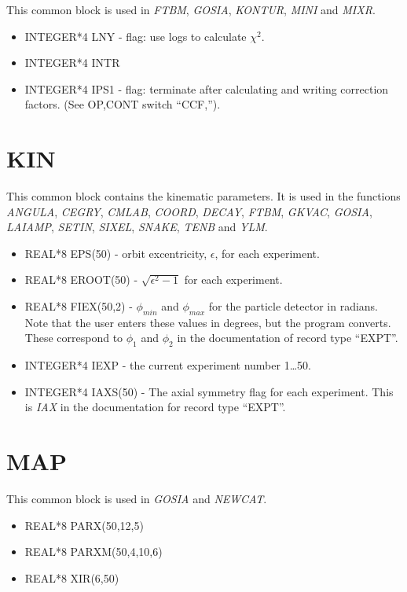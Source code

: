 This common block is used in {\em FTBM}, {\em GOSIA}, {\em KONTUR}, {\em
MINI} and {\em MIXR}.

\begin{itemize}
\item INTEGER*4 LNY - flag: use logs to calculate $\chi^2$.
\item INTEGER*4 INTR
\item INTEGER*4 IPS1 - flag: terminate after calculating and writing
correction factors. (See OP,CONT switch ``CCF,'').
\end{itemize}

\section{KIN}

This common block contains the kinematic parameters. It is used in the
functions {\em ANGULA}, {\em CEGRY}, {\em CMLAB}, {\em COORD}, {\em DECAY},
{\em FTBM}, {\em GKVAC}, {\em GOSIA}, {\em LAIAMP}, {\em SETIN}, {\em
SIXEL}, {\em SNAKE}, {\em TENB} and {\em YLM}.

\begin{itemize}
\item REAL*8 EPS(50) - orbit excentricity, $\epsilon$, for each experiment.
\item REAL*8 EROOT(50) - $\sqrt{\epsilon^2 -1}$ for each experiment.
\item REAL*8 FIEX(50,2) - $\phi_{min}$ and $\phi_{max}$ for the particle
detector in radians. Note that the user enters these values in degrees, but
the program converts. These correspond to $\phi_1$ and $\phi_2$ in the
documentation of record type ``EXPT''.
\item INTEGER*4 IEXP - the current experiment number 1{\ldots}50.
\item INTEGER*4 IAXS(50) - The axial symmetry flag for each experiment. This
is {\em IAX} in the documentation for record type ``EXPT''.
\end{itemize}

\section{MAP}

This common block is used in {\em GOSIA} and {\em NEWCAT}.

\begin{itemize}
\item REAL*8 PARX(50,12,5)
\item REAL*8 PARXM(50,4,10,6)
\item REAL*8 XIR(6,50)
\end{itemize}


